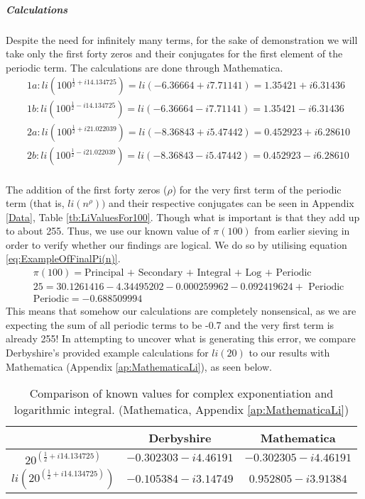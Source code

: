 \subparagraph{Calculations} Despite the need for infinitely many terms, for the sake of demonstration we will take only the first forty zeros \citep{UMNZetaZeros} and their conjugates for the first element of the periodic term. The calculations are done through Mathematica.
\begin{equation}
\begin{split}
	&1a: li(100^{\frac{1}{2}+i14.134725}) = li(-6.36664 + i7.71141) = 1.35421 + i6.31436\\
	&1b: li(100^{\frac{1}{2}-i14.134725}) = li(-6.36664 - i7.71141)= 1.35421 - i6.31436\\
	&2a: li(100^{\frac{1}{2}+i21.022039}) = li(-8.36843 + i5.47442)= 0.452923 + i6.28610\\
	&2b: li(100^{\frac{1}{2}-i21.022039}) = li(-8.36843 - i5.47442) = 0.452923 - i6.28610\\
\end{split}
\end{equation}

The addition of the first forty zeros ($\rho$) for the very first term of the periodic term (that is, $li(n^{\rho}))$ and their respective conjugates can be seen in Appendix \ref{Data}, Table \ref{tb:LiValuesFor100}. Though what is important is that they add up to about 255. Thus, we use our known value of $\pi(100)$ from earlier sieving in order to verify whether our findings are logical. We do so by utilising equation \ref{eq:ExampleOfFinalPi(n)}.
\begin{equation*}
\begin{split}
	&\pi(100) = \text{Principal + Secondary + Integral + Log + Periodic} \\
	&25 = 30.1261416 - 4.34495202 - 0.000259962 - 0.092419624 + \text{ Periodic}\\
	&\text{Periodic} = -0.688509994
\end{split}
\end{equation*}
This means that somehow our calculations are completely nonsensical, as we are expecting the sum of all periodic terms to be -0.7 and the very first term is already 255! In attempting to uncover what is generating this error, we compare Derbyshire's provided example calculations for $li(20)$ \citep[p.340]{derbyshire2003prime} to our results with Mathematica (Appendix \ref{ap:MathematicaLi}), as seen below.
\begin{table}[h]
	\centering
\begin{tabular}{c|c|c}
										& Derbyshire 			& Mathematica \\ \hline
	$20^{(\frac{1}{2}+i14.134725)}$		& $-0.302303 - i4.46191$& $ -0.302305 - i4.46191 $\\
	$li(20^{(\frac{1}{2}+i14.134725)})$	& $-0.105384 - i3.14749$& $ 0.952805 - i3.91384 $\\
\end{tabular}
\caption{Comparison of known values \citep[p.340]{derbyshire2003prime} for complex exponentiation and logarithmic integral. (Mathematica, Appendix \protect\ref{ap:MathematicaLi})}
\end{table}

